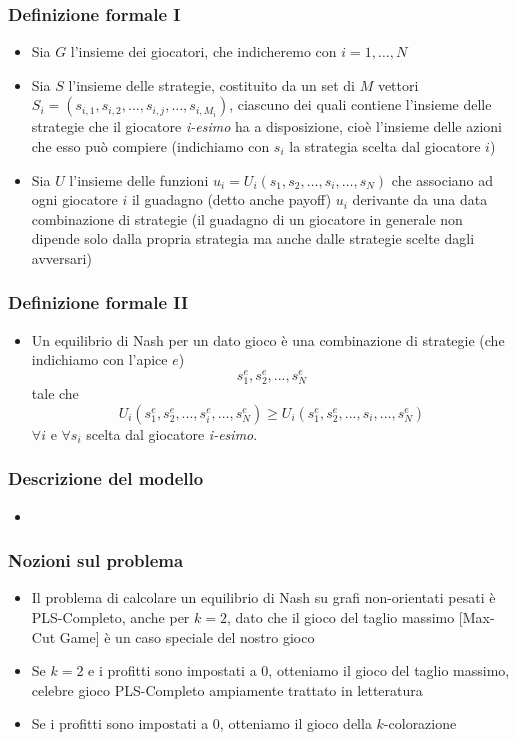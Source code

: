 \documentclass{beamer}
\begin{document}
\begin{frame}
\frametitle{Definizione formale I}
\begin{itemize}
	\item Sia $G$ l'insieme dei \alert{giocatori}, che indicheremo con $i=1,\ldots,N$
	\item Sia $S$ l'insieme delle \alert{strategie}, costituito da un set di \(M\) vettori $S_{i}=\left(s_{{i,1}},s_{{i,2}},\ldots,s_{{i,j}},\ldots,s_{{i,M_{i}}}\right)$, ciascuno dei quali contiene l'insieme delle strategie che il giocatore \textit{i-esimo} ha a disposizione, cioè l'insieme delle azioni che esso può compiere (indichiamo con $s_i$ la strategia scelta dal giocatore $i$)
	\item Sia $U$ l'insieme delle \alert{funzioni} $u_{i}=U_{i}\left(s_{1},s_{2},\ldots,s_{i},\ldots,s_{N}\right)$ che associano ad ogni giocatore $i$ il guadagno (detto anche payoff) $u_i$ derivante da una data combinazione di strategie (il guadagno di un giocatore in generale non dipende solo dalla propria strategia ma anche dalle strategie scelte dagli avversari) 
\end{itemize}
\end{frame}


\begin{frame}
\frametitle{Definizione formale II}
\begin{itemize}
	\item Un \alert{equilibrio di Nash} per un dato gioco è una combinazione di strategie (che indichiamo con l'apice $e$) \[s_{1}^{e},s_{2}^{e},...,s_{N}^{e}\] tale che \[U_{i}\left(s_{1}^{e},s_{2}^{e},...,s_{i}^{e},...,s_{N}^{e}\right)\geq U_{i}\left(s_{1}^{e},s_{2}^{e},...,s_{i},...,s_{N}^{e}\right)\] $\forall i$ e $\forall s_i$ scelta dal giocatore \textit{i-esimo}.
\end{itemize}
\end{frame}


\begin{frame}
\frametitle{Descrizione del modello}
\begin{itemize}
	\item 
\end{itemize}
\end{frame}


\begin{frame}
\frametitle{Nozioni sul problema}
\begin{itemize}
	\item Il problema di calcolare un equilibrio di Nash su grafi non-orientati pesati è \alert{PLS-Completo}, anche per $k=2$, dato che il gioco del taglio massimo [Max-Cut Game] è un caso speciale del nostro gioco
	\item Se $k=2$ e i profitti sono impostati a $0$, otteniamo il \alert{gioco del taglio massimo}, celebre gioco PLS-Completo ampiamente trattato in letteratura
	\item Se i profitti sono impostati a $0$, otteniamo il \alert{gioco della $k$-colorazione}
\end{itemize}
\end{frame}
\end{document}
